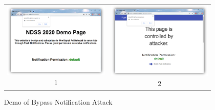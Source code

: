 \begin{figure}[ht]
\caption{Demo of Bypass Notification Attack }
\begin{center}
\label{bypassAttack}
\begin{tabular}{cc}

 \begin{minipage}{.2\textwidth}
      \includegraphics[width=\linewidth]{figs/attack_1.PNG}{1}
    \end{minipage}
 & 
\begin{minipage}{.2\textwidth}
      \includegraphics[width=\linewidth]{figs/attack_2.PNG}{2}
    \end{minipage}
 \\
 

\end{tabular}
\end{center}
\end{figure}
